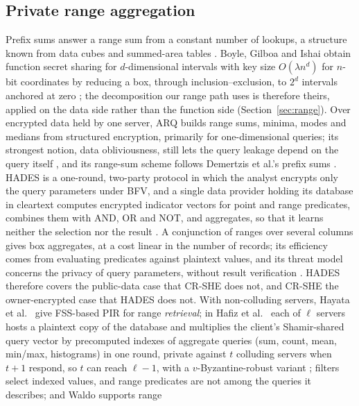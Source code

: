 \documentclass[a4paper,fleqn]{cas-sc}
\begin{document}
\subsection{Private range aggregation}
Prefix sums answer a range sum from a constant number of lookups, a structure
known from data cubes \citep{ho1997range} and summed-area tables
\citep{crow1984summed}. Boyle, Gilboa and Ishai obtain function secret sharing
for $d$-dimensional intervals with key size $O(\lambda n^d)$ for $n$-bit
coordinates by reducing a box, through inclusion--exclusion, to $2^d$
intervals anchored at zero \citep[Cor.~3.4]{boyle2016function}; the
decomposition our range path uses is therefore theirs, applied on the data side
rather than the function side (Section~\ref{sec:range}). Over encrypted data
held by one server, ARQ \citep{espiritu2022arq} builds range sums, minima,
modes and medians from structured encryption, primarily for one-dimensional
queries; its strongest notion, data obliviousness, still lets the query leakage
depend on the query itself \citep[Def.~3.3]{espiritu2022arq}, and its range-sum
scheme follows Demertzis et al.'s prefix sums \citep{demertzis2018practical}.
HADES \citep{liu2025hades} is a one-round, two-party protocol in which the
analyst encrypts only the query parameters under BFV, and a single data
provider holding its database in cleartext computes encrypted indicator
vectors for point and range predicates, combines them with AND, OR and NOT,
and aggregates, so that it learns neither the selection nor the result
\citep[\S2--\S3]{liu2025hades}. A conjunction of ranges over several columns
gives box aggregates, at a cost linear in the number of records; its
efficiency comes from evaluating predicates against plaintext values, and its
threat model concerns the privacy of query parameters, without result
verification \citep[\S2.3]{liu2025hades}. HADES therefore covers the public-data
case that CR-SHE does not, and CR-SHE the owner-encrypted case that HADES
does not.
With non-colluding servers, Hayata et al.\ \citep{hayata2020private} give
FSS-based PIR for range \emph{retrieval}; in Hafiz et
al.\ \citep{hafiz2024private} each of $\ell$ servers hosts a plaintext copy of
the database and multiplies the client's Shamir-shared query vector by
precomputed indexes of aggregate queries (sum, count, mean, min/max,
histograms) in one round, private against $t$ colluding servers when $t+1$
respond, so $t$ can reach $\ell-1$, with a $v$-Byzantine-robust variant
\citep[\S II, \S VI-C, App.~B]{hafiz2024private}; filters select indexed
values, and range predicates are not among the queries it describes; and Waldo \citep{waldo} supports range
\end{document}
